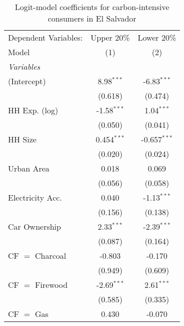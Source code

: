 
\begin{table}[htbp!]
   \centering
   \small
   \begin{adjustbox}{width = 1\textwidth, max height = 0.95\textheight, center}
      \begin{threeparttable}[b]
         \caption{\label{tab:Logit_1_SLV} Logit-model coefficients for carbon-intensive consumers in El Salvador}
         \begin{tabular}{lcc}
            \tabularnewline \midrule \midrule
            Dependent Variables: & Upper 20\%    & Lower 20\%\\   
            Model                & (1)           & (2)\\  
            \midrule
            \emph{Variables}\\
            (Intercept)          & 8.98$^{***}$  & -6.83$^{***}$\\   
                                 & (0.618)       & (0.474)\\   
            HH Exp. (log)        & -1.58$^{***}$ & 1.04$^{***}$\\   
                                 & (0.050)       & (0.041)\\   
            HH Size              & 0.454$^{***}$ & -0.657$^{***}$\\   
                                 & (0.020)       & (0.024)\\   
            Urban Area           & 0.018         & 0.069\\   
                                 & (0.056)       & (0.058)\\   
            Electricity Acc.     & 0.040         & -1.13$^{***}$\\   
                                 & (0.156)       & (0.138)\\   
            Car Ownership        & 2.33$^{***}$  & -2.39$^{***}$\\   
                                 & (0.087)       & (0.164)\\   
            CF $=$ Charcoal      & -0.803        & -0.170\\   
                                 & (0.949)       & (0.609)\\   
            CF $=$ Firewood      & -2.69$^{***}$ & 2.61$^{***}$\\   
                                 & (0.585)       & (0.335)\\   
            CF $=$ Gas           & 0.430         & -0.070\\   

\end{tabular}
\end{threeparttable}
\end{adjustbox}
\end{table}
